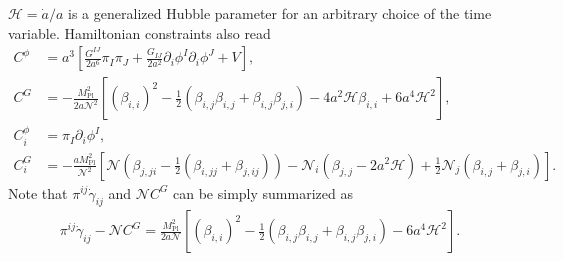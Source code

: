 \documentclass[aps, prd
, preprint
, nofootinbib 
, notitlepage
, longbibliography
]{revtex4-1}
\newcommand{\Mpl}{M_\text{Pl}}
\newcommand{\calH}{\mathcal{H}}
\newcommand{\calN}{\mathcal{N}}
\newcommand{\bae}[1]{\begin{align} #1 \end{align}}
\begin{document}
$\calH=\dot{a}/a$ is a generalized Hubble parameter for an arbitrary choice of the time variable.
Hamiltonian constraints also read
\bae{
    C^\phi&=a^3\left[\frac{G^{IJ}}{2a^6}\pi_I\pi_J+\frac{G_{IJ}}{2a^2}\partial_i\phi^I\partial_i\phi^J+V\right], \\
    C^G&=-\frac{\Mpl^2}{2a\calN^2}\left[(\beta_{i,i})^2-\frac{1}{2}(\beta_{i,j}\beta_{i,j}+\beta_{i,j}\beta_{j,i})-4a^2\calH\beta_{i,i}+6a^4\calH^2\right], \\
    C_i^\phi&=\pi_I\partial_i\phi^I, \\
    C_i^G&=-\frac{a\Mpl^2}{\calN^2}\left[\calN\left(\beta_{j,ji}-\frac{1}{2}(\beta_{i,jj}+\beta_{j,ij})\right)-\calN_i(\beta_{j,j}-2a^2\calH)+\frac{1}{2}\calN_j(\beta_{i,j}+\beta_{j,i})\right].
}
Note that $\pi^{ij}\dot{\gamma}_{ij}$ and $\calN C^G$ can be simply summarized as
\bae{
	\pi^{ij}\dot{\gamma}_{ij}-\calN C^G=\frac{\Mpl^2}{2a\calN}\left[(\beta_{i,i})^2-\frac{1}{2}(\beta_{i,j}\beta_{i,j}+\beta_{i,j}\beta_{j,i})-6a^4\calH^2\right].
}
\end{document}
